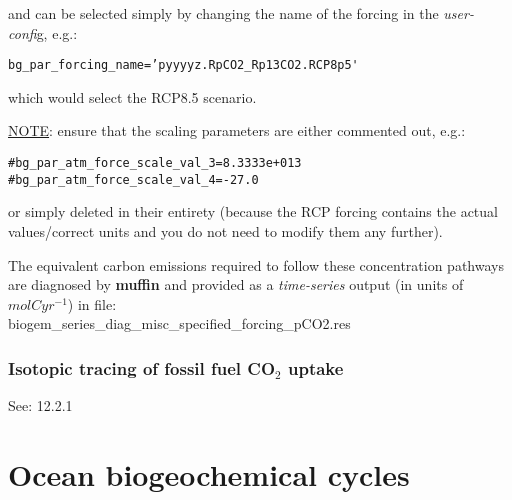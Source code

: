 \documentclass[11pt,fleqn]{book} %
\begin{document}
\noindent and can be selected simply by changing the name of the forcing in the \textit{user-confi}g, e.g.:
\vspace{-2pt}\begin{verbatim}
bg_par_forcing_name=’pyyyyz.RpCO2_Rp13CO2.RCP8p5'
\end{verbatim}\vspace{-2pt}
\noindent which would select the RCP8.5 scenario.

\vspace{1mm}
\noindent \uline{NOTE}: ensure that
the scaling parameters are either commented out, e.g.:
\vspace{-2pt}\small\begin{verbatim}
#bg_par_atm_force_scale_val_3=8.3333e+013
#bg_par_atm_force_scale_val_4=-27.0
\end{verbatim}\normalsize\vspace{-2pt}
\noindent or simply deleted in their entirety (because the RCP forcing contains the actual values/correct units and you do not need to modify them any further).

The equivalent carbon emissions required to follow these concentration pathways are diagnosed by \textbf{muffin} and provided as a \textit{time-series} output (in units of \(mol C yr^{-1}\)) in file: 
\vspace{1mm}
\\\textsf{\footnotesize biogem\_series\_diag\_misc\_specified\_forcing\_pCO2.res}


\subsection{Isotopic tracing of fossil fuel CO$_{2}$ uptake}

See: 12.2.1


\cleardoublepage


\chapter{Ocean biogeochemical cycles}

\hfill \break
\end{document}
